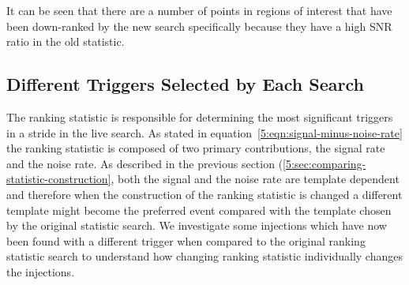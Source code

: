 %
It can be seen that there are a number of points in regions of interest that have been down-ranked by the new search specifically because they have a high SNR ratio in the old statistic.


\subsection{\label{5:sec:diff-triggers}Different Triggers Selected by Each Search}

The ranking statistic is responsible for determining the most significant triggers in a stride in the live search. As stated in equation~\ref{5:eqn:signal-minus-noise-rate} the ranking statistic is composed of two primary contributions, the signal rate and the noise rate. As described in the previous section (\ref{5:sec:comparing-statistic-construction}, both the signal and the noise rate are template dependent and therefore when the construction of the ranking statistic is changed a different template might become the preferred event compared with the template chosen by the original statistic search. We investigate some injections which have now been found with a different trigger when compared to the original ranking statistic search to understand how changing ranking statistic individually changes the injections.


